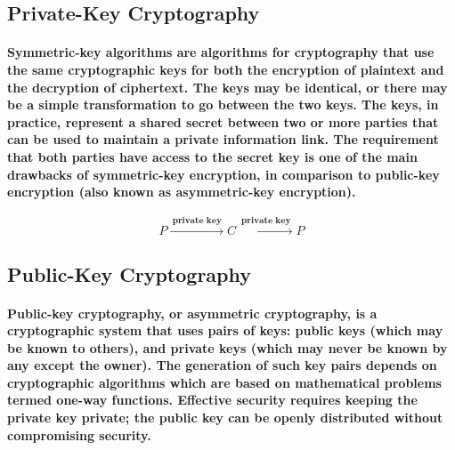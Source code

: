 \documentclass[10pt,british]{article}
\begin{document}
\subsection{Private-Key Cryptography}

\paragraph{\textmd{Symmetric-key algorithms are algorithms for cryptography
that use the same cryptographic keys for both the encryption of plaintext
and the decryption of ciphertext. The keys may be identical, or there
may be a simple transformation to go between the two keys. The keys,
in practice, represent a shared secret between two or more parties
that can be used to maintain a private information link. The requirement
that both parties have access to the secret key is one of the main
drawbacks of symmetric-key encryption, in comparison to public-key
encryption (also known as asymmetric-key encryption).}}
\begin{center}
$$ P\xrightarrow{\:\textbf{private key}\:}C\xrightarrow{\:\textbf{private key}\:}P $$
\par\end{center}

\subsection{Public-Key Cryptography}

\paragraph{\textmd{Public-key cryptography, or asymmetric cryptography, is a
cryptographic system that uses pairs of keys: public keys (which may
be known to others), and private keys (which may never be known by
any except the owner). The generation of such key pairs depends on
cryptographic algorithms which are based on mathematical problems
termed one-way functions. Effective security requires keeping the
private key private; the public key can be openly distributed without
compromising security.}}
\end{document}
